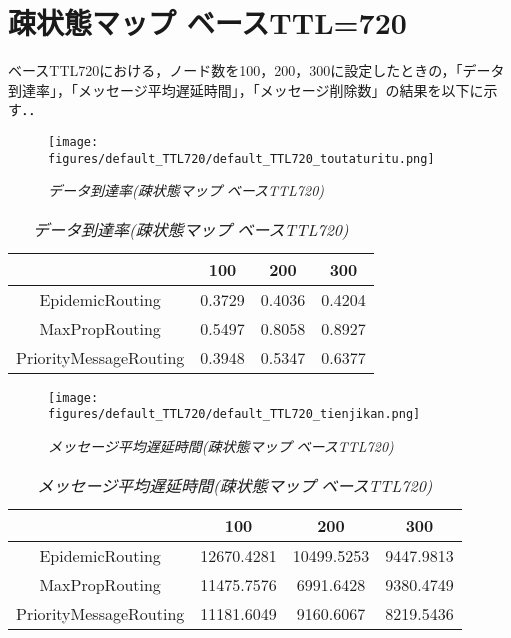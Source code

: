 \documentclass[11pt]{icsthesis}
\begin{document}
\section{疎状態マップ ベースTTL=720}
ベースTTL720における，ノード数を100，200，300に設定したときの，「データ到達率」，「メッセージ平均遅延時間」，「メッセージ削除数」の結果を以下に示す．．

\begin{figure}[h]
\centering
\texttt{[image: figures/default\_TTL720/default\_TTL720\_toutaturitu.png]}
\caption[]{\it{データ到達率(疎状態マップ ベースTTL720)}}
\label{somituttl720deliveryprobgraph}
\end{figure}

\begin{table}[H]
 \begin{center}
      \caption[]{\it{データ到達率(疎状態マップ ベースTTL720)}}
      \label{somituTtl720deliveryprob}
      \begin{tabular}{|c|c|c|c|}
\hline
&100&200&300\\
\hline
EpidemicRouting&0.3729&0.4036&0.4204\\
\hline
MaxPropRouting&0.5497&0.8058&0.8927\\
\hline
PriorityMessageRouting&0.3948&0.5347&0.6377\\
\hline
      \end{tabular}
    \end{center}
\end{table}

\newpage

\begin{figure}[h]
\centering
\texttt{[image: figures/default\_TTL720/default\_TTL720\_tienjikan.png]}
\caption[]{\it{メッセージ平均遅延時間(疎状態マップ ベースTTL720)}}
\label{somituttl720latencyavggraph}
\end{figure}

\begin{table}[H]
 \begin{center}
      \caption[]{\it{メッセージ平均遅延時間(疎状態マップ ベースTTL720)}}
      \label{somituTtl720latencyavg}
      \begin{tabular}{|c|c|c|c|}
\hline
&100&200&300\\
\hline
EpidemicRouting&12670.4281&10499.5253&9447.9813\\
\hline
MaxPropRouting&11475.7576&6991.6428&9380.4749\\
\hline
PriorityMessageRouting&11181.6049&9160.6067&8219.5436\\
\hline
      \end{tabular}
    \end{center}
\end{table}
\end{document}
